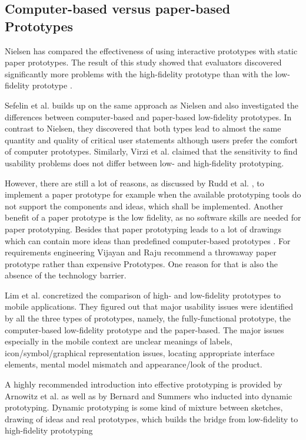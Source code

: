 \subsection{Computer-based versus paper-based Prototypes}
Nielsen has compared the effectiveness of using interactive prototypes with static paper prototypes. The result of this study showed that evaluators discovered significantly
more problems with the high-fidelity prototype than with the low-fidelity prototype \cite{nielsen1990paper}.

Sefelin et al. \cite{sefelin2003paper} builds up on the same approach as Nielsen and also investigated the differences between computer-based and paper-based low-fidelity prototypes. In contrast to Nielsen, they discovered that both types lead to almost the same quantity and quality of critical user statements although users prefer the comfort of computer prototypes. Similarly, Virzi et al. \cite{virzi1996usability} claimed that the
sensitivity to find usability problems does not differ between low- and high-fidelity prototyping.

However, there are still a lot of reasons, as discussed by Rudd et al. \cite{rudd1996low}, to implement a paper prototype for example when the available prototyping tools do not support the components and ideas, which shall be implemented. Another benefit of a paper prototype is the low fidelity, as no software skills are needed for paper prototyping. Besides that paper prototyping leads to a lot of drawings which can contain more ideas than predefined computer-based prototypes . For requirements engineering Vijayan and Raju \cite{vijayan2011new} recommend a throwaway paper prototype rather than expensive Prototypes. One reason for that is also the absence of the technology barrier.

Lim et al.\cite{lim2006comparative} concretized the comparison of high- and low-fidelity prototypes to mobile applications. They figured out that major usability issues were identified by all the three types of prototypes, namely, the fully-functional prototype, the computer-based low-fidelity prototype and the paper-based.  The major issues especially in the mobile context are unclear meanings of labels, icon/symbol/graphical representation issues, locating appropriate interface elements, mental model mismatch and appearance/look of
the product. 

A highly recommended introduction into effective prototyping is provided by Arnowitz et al. \cite{arnowitz2010effective} as well as by Bernard and Summers \cite{bernard2010dynamic} who inducted into dynamic prototyping. Dynamic prototyping is some kind of mixture between sketches, drawing of ideas and real prototypes, which builds the bridge from low-fidelity to high-fidelity prototyping

